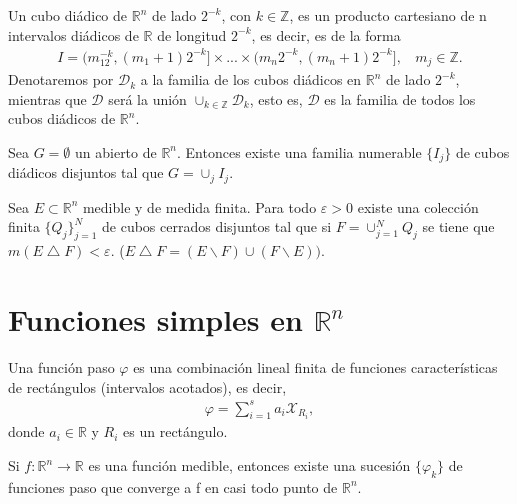 \begin{defi}
Un cubo diádico de $\mathbb{R}^n$ de lado $2^{-k}$, con $k \in \mathbb{Z}$, es un producto cartesiano de n intervalos diádicos de $\mathbb{R}$ de longitud $2^{-k}$, es decir, es de la forma
\begin{align*}
    I = (m_12^{-k}, (m_1 + 1)2^{-k}] \times ... \times (m_n2^{-k}, (m_n + 1)2^{-k}], \ \ \ \ m_j \in \mathbb{Z}.
\end{align*}
Denotaremos por $\mathcal{D}_k$ a la familia de los cubos diádicos en $\mathbb{R}^n$ de lado $2^{-k}$, mientras que $\mathcal{D}$ será la unión $\cup_{k \in \mathbb{Z}}{\mathcal{D}_k}$, esto es, $\mathcal{D}$ es la familia de todos los cubos diádicos de $\mathbb{R}^n$.
\end{defi}

\begin{teo}
Sea $G = \emptyset$ un abierto de $\mathbb{R}^n$. Entonces existe una familia numerable $\{I_j\}$ de cubos diádicos disjuntos tal que $G = \cup_{j}{I_j}$.
\end{teo}

\begin{teo}
Sea $E \subset \mathbb{R}^n$ medible y de medida finita. Para todo $\varepsilon > 0$ existe una colección finita $\{Q_j\}_{j=1}^{N}$ de cubos cerrados disjuntos tal que si $F = \cup_{j=1}^{N}{Q_j}$ se tiene que $m(E \bigtriangleup F) < \varepsilon$. ($E \bigtriangleup F = (E \backslash F) \cup (F \backslash E))$.
\end{teo}

\section{Funciones simples en $\mathbb{R}^n$}

\begin{defi}
Una función paso $\varphi$ es una combinación lineal finita de funciones características de rectángulos (intervalos acotados), es decir,
\begin{align*}
    \varphi = \sum_{i=1}^{s}{a_i\mathcal{X}_{R_i}},
\end{align*}
donde $a_i \in \mathbb{R}$ y $R_i$ es un rectángulo.
\end{defi}

\begin{teo}
Si $f: \mathbb{R}^n \longrightarrow \mathbb{R}$ es una función medible, entonces existe una sucesión $\{\varphi_k\}$ de funciones paso que converge a f en casi todo punto de $\mathbb{R}^n$.
\end{teo}

